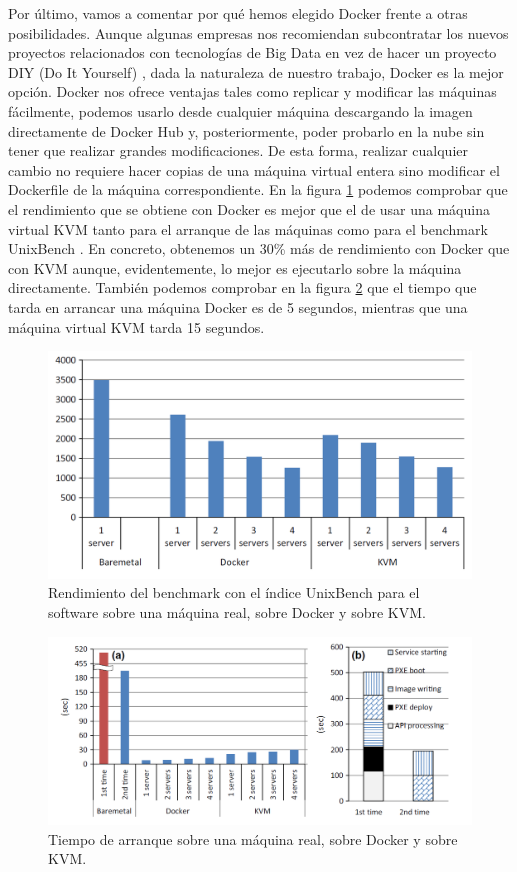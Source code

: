 Por último, vamos a comentar por qué hemos elegido Docker frente a otras
posibilidades. Aunque algunas empresas nos recomiendan subcontratar los
nuevos proyectos relacionados con tecnologías de Big Data en vez de hacer
un proyecto DIY (Do It Yourself) \cite{Dck-14}, dada la naturaleza de
nuestro trabajo, Docker es la mejor opción. Docker nos ofrece ventajas
tales como replicar y modificar las máquinas fácilmente, podemos usarlo
desde cualquier máquina descargando la imagen directamente de Docker Hub y,
posteriormente, poder probarlo en la nube sin tener que realizar grandes
modificaciones. De esta forma, realizar cualquier cambio no requiere hacer
copias de una máquina virtual entera sino modificar el Dockerfile de la
máquina correspondiente. En la figura \ref{dock-2} \cite{Dck-15} podemos
comprobar que el rendimiento que se obtiene con Docker es mejor que el de
usar una máquina virtual KVM tanto para el arranque de las máquinas como
para el benchmark UnixBench \cite{Dck-15}. En concreto, obtenemos un 30\%
más de rendimiento con Docker que con KVM aunque, evidentemente, lo mejor
es ejecutarlo sobre la máquina directamente. También podemos comprobar en
la figura \ref{dock-3} \cite{Dck-15} que el tiempo que tarda en arrancar
una máquina Docker es de 5 segundos, mientras que una máquina virtual KVM
tarda 15 segundos.

\begin{figure}[htp]
\centering
\includegraphics[scale=0.40]{Imagenes/dockervsvm2.png}
\caption{Rendimiento del benchmark con el índice UnixBench para el software
  sobre una máquina real, sobre Docker y sobre KVM.}
\label{dock-2}
\end{figure}

\begin{figure}[htp]
\centering
\includegraphics[scale=0.40]{Imagenes/dockervsvm3.png}
\caption{Tiempo de arranque sobre una máquina real, sobre Docker y sobre
  KVM.}
\label{dock-3}
\end{figure}


